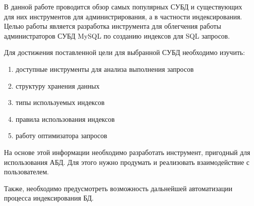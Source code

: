 В данной работе проводится обзор самых популярных СУБД и существующих для них инструментов для администрирования, а в частности индексирования.  Целью работы является разработка инструмента для облегчения работы администраторов СУБД MySQL по созданию индексов для SQL запросов.

Для достижения поставленной цели для выбранной СУБД необходимо изучить: 
\begin{enumerate}
\item доступные инструменты для анализа выполнения запросов
\item структуру хранения данных
\item типы используемых индексов
\item правила использования индексов
\item работу оптимизатора запросов
\end{enumerate}

На основе этой информации необходимо разработать инструмент, пригодный для использования АБД. Для этого нужно продумать и реализовать взаимодействие с пользователем.

Также, необходимо предусмотреть возможность дальнейшей автоматизации процесса индексирования БД.